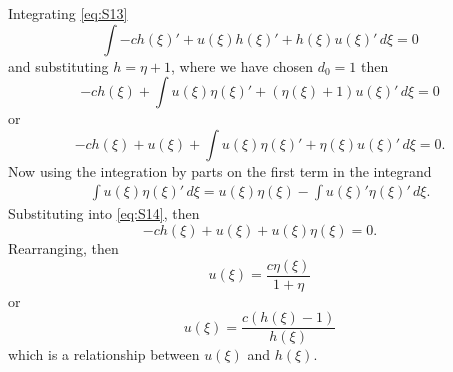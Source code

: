 \documentclass[subeqn]{article}
\begin{document}
Integrating \eqref{eq:S13}
\begin{equation*}
\int -c h(\xi)' + u(\xi)h(\xi)' + h(\xi)u(\xi)' \, d\xi = 0
\end{equation*}
and substituting $h = \eta + 1$, where we have chosen $d_0 = 1$ then
\begin{equation*}
-c h(\xi) + \int u(\xi)\eta(\xi)' + (\eta(\xi) + 1)u(\xi)' \, d\xi = 0
\end{equation*}
or
\begin{equation}
-c h(\xi) + u(\xi) + \int u(\xi)\eta(\xi)' + \eta(\xi) u(\xi)' \, d\xi = 0.
\label{eq:S14}
\end{equation}
Now using the integration by parts on the first term in the integrand
\begin{gather*}
\int u(\xi)\eta(\xi)' \, d\xi = u(\xi)\eta(\xi) - \int u(\xi)' \eta(\xi)' \, d\xi.
\end{gather*}
Substituting into \eqref{eq:S14}, then
\begin{equation*}
-c h(\xi) + u(\xi) + u(\xi)\eta(\xi) = 0.
\end{equation*}
Rearranging, then
\begin{equation*}
u(\xi) = \dfrac{c\eta(\xi)}{1 + \eta}
\end{equation*}
or
\begin{equation}
u(\xi) = \dfrac{c(h(\xi) - 1)}{h(\xi)}
\label{eq:u-h}
\end{equation}
which is a relationship between $u(\xi)$ and $h(\xi)$.
\end{document}
